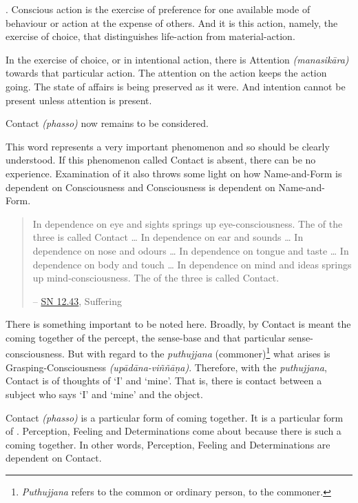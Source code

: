 . Conscious action is the exercise of preference for one available mode of behaviour or action at the expense of others. And it is this action, namely, the exercise of choice, that distinguishes life-action from material-action.

In the exercise of choice, or in intentional action, there is Attention \emph{(manasikāra)} towards that particular action. The attention on the action keeps the action going. The state of affairs is being preserved as it were. And intention cannot be present unless attention is present.

Contact \emph{(phasso)} now remains to be considered.

This word represents a very important phenomenon and so should be clearly understood. If this phenomenon called Contact is absent, there can be no experience. Examination of it also throws some light on how Name-and-Form is dependent on Consciousness and Consciousness is dependent on Name-and- Form.

\begin{quote}
In dependence on eye and sights springs up eye-consciousness. The  of the three is called Contact \ldots{} In dependence on ear and sounds \ldots{} In dependence on nose and odours \ldots{} In dependence on tongue and taste \ldots{} In dependence on body and touch \ldots{} In dependence on mind and ideas springs up mind-consciousness. The  of the three is called Contact.

 -- \href{https://suttacentral.net/sn12.43/en/bodhi}{SN 12.43}, Suffering
\end{quote}

There is something important to be noted here. Broadly, by Contact is meant the coming together of the percept, the sense-base and that particular sense-consciousness. But with regard to the \emph{puthujjana} (commoner)\footnote{\emph{Puthujjana} refers to the common or ordinary person, to the commoner.} what arises is Grasping-Consciousness \emph{(upādāna-viññāṇa)}. Therefore, with the \emph{puthujjana}, Contact is  of thoughts of `I' and `mine'. That is, there is contact between a subject who says `I' and `mine' and the object.

Contact \emph{(phasso)} is a particular form of coming together. It is a particular form of . Perception, Feeling and Determinations come about because there is such a coming together. In other words, Perception, Feeling and Determinations are dependent on Contact.


